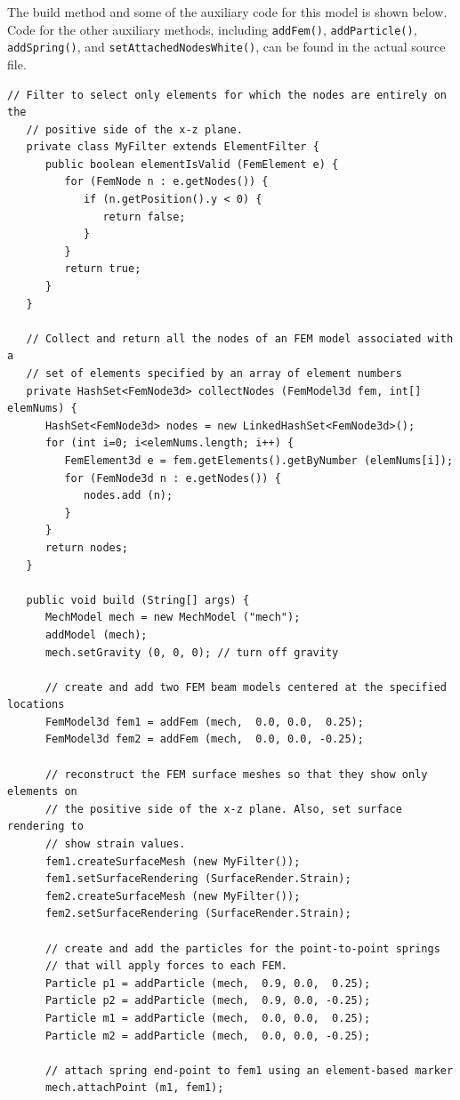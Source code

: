 The build method and some of the auxiliary code for this model is shown below.
Code for the other auxiliary methods, including {\tt addFem()},
{\tt addParticle()}, {\tt addSpring()}, and {\tt setAttachedNodesWhite()},
can be found in the actual source file.
\lstset{numbers=left}
\begin{lstlisting}[]
   // Filter to select only elements for which the nodes are entirely on the
   // positive side of the x-z plane.
   private class MyFilter extends ElementFilter {
      public boolean elementIsValid (FemElement e) {
         for (FemNode n : e.getNodes()) {
            if (n.getPosition().y < 0) {
               return false;
            }
         }
         return true;         
      }
   }

   // Collect and return all the nodes of an FEM model associated with a
   // set of elements specified by an array of element numbers
   private HashSet<FemNode3d> collectNodes (FemModel3d fem, int[] elemNums) {
      HashSet<FemNode3d> nodes = new LinkedHashSet<FemNode3d>();
      for (int i=0; i<elemNums.length; i++) {
         FemElement3d e = fem.getElements().getByNumber (elemNums[i]);
         for (FemNode3d n : e.getNodes()) {
            nodes.add (n);
         }
      }
      return nodes;
   }

   public void build (String[] args) {
      MechModel mech = new MechModel ("mech");
      addModel (mech);
      mech.setGravity (0, 0, 0); // turn off gravity

      // create and add two FEM beam models centered at the specified locations
      FemModel3d fem1 = addFem (mech,  0.0, 0.0,  0.25);
      FemModel3d fem2 = addFem (mech,  0.0, 0.0, -0.25);

      // reconstruct the FEM surface meshes so that they show only elements on
      // the positive side of the x-z plane. Also, set surface rendering to
      // show strain values.
      fem1.createSurfaceMesh (new MyFilter());
      fem1.setSurfaceRendering (SurfaceRender.Strain);
      fem2.createSurfaceMesh (new MyFilter());
      fem2.setSurfaceRendering (SurfaceRender.Strain);

      // create and add the particles for the point-to-point springs
      // that will apply forces to each FEM.
      Particle p1 = addParticle (mech,  0.9, 0.0,  0.25);
      Particle p2 = addParticle (mech,  0.9, 0.0, -0.25);
      Particle m1 = addParticle (mech,  0.0, 0.0,  0.25);
      Particle m2 = addParticle (mech,  0.0, 0.0, -0.25);

      // attach spring end-point to fem1 using an element-based marker
      mech.attachPoint (m1, fem1);


\end{lstlisting}

